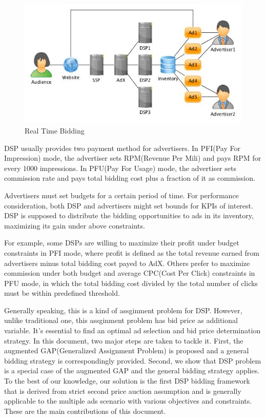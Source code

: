 \documentclass[sigconf]{acmart}
\begin{document}
\begin{figure}[!h]
\centering
\includegraphics[width=1.0\linewidth]{./DSP.jpg}
\caption{Real Time Bidding}
\end{figure}

DSP usually provides two payment method for advertisers.
In PFI(Pay For Impression) mode, the advertiser sets RPM(Revenue Per Mili) and pays RPM for every 1000 impressions.
In PFU(Pay For Usage) mode, the advertiser sets commission rate and pays total bidding cost plus a fraction of it as commission.

Advertisers must set budgets for a certain period of time.
For performance consideration, both DSP and advertisers might set bounds for KPIs of interest.
DSP is supposed to distribute the bidding opportunities to ads in its inventory, maximizing its gain under above constraints.

For example, some DSPs are willing to maximize their profit under budget constraints in PFI mode,
    where profit is defined as the total revenue earned from advertisers minus total bidding cost payed to AdX.
Others prefer to maximize commission under both budget and average CPC(Cost Per Click) constraints in PFU mode,
    in which the total bidding cost divided by the total number of clicks must be within predefined threshold.

Generally speaking, this is a kind of assginment problem for DSP.
However, unlike traditional one, this assginment problem has bid price as additional variable.
It's essential to find an optimal ad selection and bid price determination strategy.
In this document, two major steps are taken to tackle it.
First, the augmented GAP(Generalized Assignment Problem) is proposed and a general bidding strategy is correspondingly provided.
Second, we show that DSP problem is a special case of the augmented GAP and the general bidding strategy applies.
To the best of our knowledge, our solution is the first DSP bidding framework
    that is derived from strict second price auction assumption and is generally applicable
    to the multiple ads scenario with various objectives and constraints.
These are the main contributions of this document.
\end{document}
